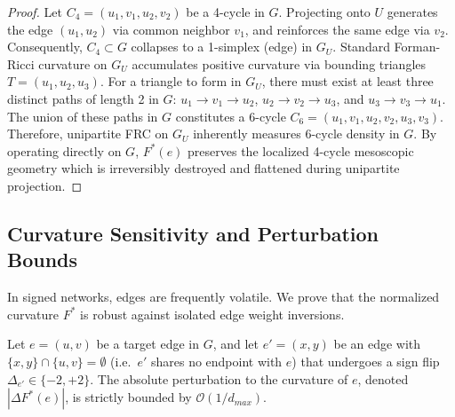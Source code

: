 \documentclass{siuro250211}
\theoremstyle{remark}
\theoremstyle{plain}
\begin{document}
\begin{proof}
Let $C_4 = (u_1, v_1, u_2, v_2)$ be a 4-cycle in $G$. Projecting onto $U$ generates the edge $(u_1, u_2)$ via common neighbor $v_1$, and reinforces the same edge via $v_2$. Consequently, $C_4 \subset G$ collapses to a 1-simplex (edge) in $G_U$. Standard Forman-Ricci curvature on $G_U$ accumulates positive curvature via bounding triangles $T = (u_1, u_2, u_3)$. For a triangle to form in $G_U$, there must exist at least three distinct paths of length 2 in $G$: $u_1 \to v_1 \to u_2$, $u_2 \to v_2 \to u_3$, and $u_3 \to v_3 \to u_1$. The union of these paths in $G$ constitutes a 6-cycle $C_6 = (u_1, v_1, u_2, v_2, u_3, v_3)$. Therefore, unipartite FRC on $G_U$ inherently measures 6-cycle density in $G$. By operating directly on $G$, $F^*(e)$ preserves the localized 4-cycle mesoscopic geometry which is irreversibly destroyed and flattened during unipartite projection.
\end{proof}

\subsection{Curvature Sensitivity and Perturbation Bounds}
In signed networks, edges are frequently volatile. We prove that the normalized curvature $F^*$ is robust against isolated edge weight inversions.

\begin{theorem}
\label{thm:lipschitz}
Let $e = (u,v)$ be a target edge in $G$, and let $e' = (x,y)$ be an edge with $\{x,y\} \cap \{u,v\} = \emptyset$ (i.e.\ $e'$ shares no endpoint with $e$) that undergoes a sign flip $\Delta_{e'} \in \{-2, +2\}$. The absolute perturbation to the curvature of $e$, denoted $|\Delta F^*(e)|$, is strictly bounded by $\mathcal{O}(1/d_{max})$.
\end{theorem}
\end{document}
